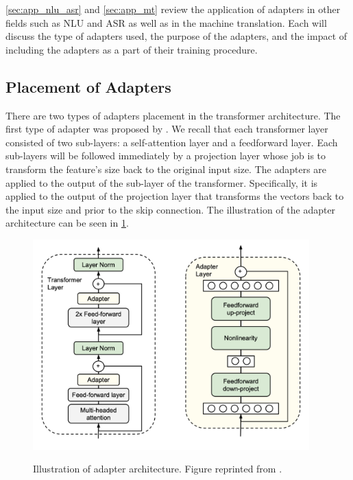 \cref{sec:app_nlu_asr} and \cref{sec:app_mt} review the application of adapters in other fields such as NLU and ASR as well as in the machine translation. Each will discuss the type of adapters used, the purpose of the adapters, and the impact of including the adapters as a part of their training procedure.

\subsection{Placement of Adapters}
\label{sec:adapter_place}
There are two types of adapters placement in the transformer architecture. The first type of adapter was proposed by . We recall that each transformer layer consisted of two sub-layers: a self-attention layer and a feedforward layer. Each sub-layers will be followed immediately by a projection layer whose job is to transform the feature's size back to the original input size. The adapters are applied to the output of the sub-layer of the transformer. Specifically, it is applied to the output of the projection layer that transforms the vectors back to the input size and prior to the skip connection. The illustration of the adapter architecture can be seen in \cref{img:ada_houlsby}.

\begin{figure}[h]
    {\includegraphics[width=0.95\textwidth]{img/adapter_houlsby.png}}
    \centering
    \caption{Illustration of adapter architecture. Figure reprinted from .}
    \label{img:ada_houlsby}
\end{figure}

